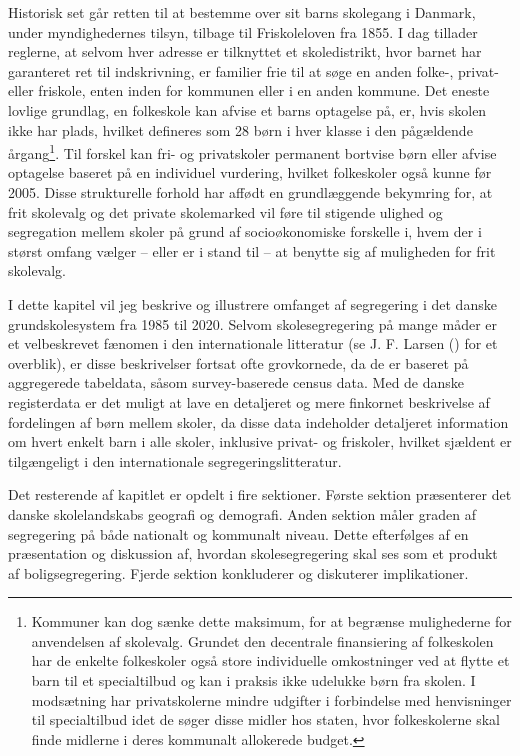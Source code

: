 \documentclass[
]{book}
\begin{document}
Historisk set går retten til at bestemme over sit barns skolegang i Danmark, under myndighedernes tilsyn, tilbage til Friskoleloven fra 1855. I dag tillader reglerne, at selvom hver adresse er tilknyttet et skoledistrikt, hvor barnet har garanteret ret til indskrivning, er familier frie til at søge en anden folke-, privat- eller friskole, enten inden for kommunen eller i en anden kommune. Det eneste lovlige grundlag, en folkeskole kan afvise et barns optagelse på, er, hvis skolen ikke har plads, hvilket defineres som 28 børn i hver klasse i den pågældende årgang\footnote{Kommuner kan dog sænke dette maksimum, for at begrænse mulighederne for anvendelsen af skolevalg. Grundet den decentrale finansiering af folkeskolen har de enkelte folkeskoler også store individuelle omkostninger ved at flytte et barn til et specialtilbud og kan i praksis ikke udelukke børn fra skolen. I modsætning har privatskolerne mindre udgifter i forbindelse med henvisninger til specialtilbud idet de søger disse midler hos staten, hvor folkeskolerne skal finde midlerne i deres kommunalt allokerede budget.}. Til forskel kan fri- og privatskoler permanent bortvise børn eller afvise optagelse baseret på en individuel vurdering, hvilket folkeskoler også kunne før 2005. Disse strukturelle forhold har affødt en grundlæggende bekymring for, at frit skolevalg og det private skolemarked vil føre til stigende ulighed og segregation mellem skoler på grund af socioøkonomiske forskelle i, hvem der i størst omfang vælger -- eller er i stand til -- at benytte sig af muligheden for frit skolevalg.

I dette kapitel vil jeg beskrive og illustrere omfanget af segregering i det danske grundskolesystem fra 1985 til 2020. Selvom skolesegregering på mange måder er et velbeskrevet fænomen i den internationale litteratur (se J. F. Larsen () for et overblik), er disse beskrivelser fortsat ofte grovkornede, da de er baseret på aggregerede tabeldata, såsom survey-baserede census data. Med de danske registerdata er det muligt at lave en detaljeret og mere finkornet beskrivelse af fordelingen af børn mellem skoler, da disse data indeholder detaljeret information om hvert enkelt barn i alle skoler, inklusive privat- og friskoler, hvilket sjældent er tilgængeligt i den internationale segregeringslitteratur.

Det resterende af kapitlet er opdelt i fire sektioner. Første sektion præsenterer det danske skolelandskabs geografi og demografi. Anden sektion måler graden af segregering på både nationalt og kommunalt niveau. Dette efterfølges af en præsentation og diskussion af, hvordan skolesegregering skal ses som et produkt af boligsegregering. Fjerde sektion konkluderer og diskuterer implikationer.
\end{document}
